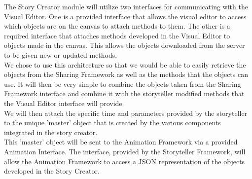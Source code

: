 \documentclass[12pt]{article}
\begin{document}
The Story Creator module will utilize two interfaces for communicating with the Visual Editor. One is a provided interface that allows the visual editor to access which objects are on the canvas to attach methods to them. The other is a required interface that attaches methods developed in the Visual Editor to objects made in the canvas. This allows the objects downloaded from the server to be given new or updated methods. \\

We chose to use this architecture so that we would be able to easily retrieve the objects from the Sharing Framework as well as the methods that the objects can use.  It will then be very simple to combine the objects taken from the Sharing Framework interface and combine it with the storyteller modified methods that the Visual Editor interface will provide.  \\

We will then attach the specific time and parameters provided by the storyteller to the unique 'master' object that is created by the various components integrated in the story creator. \\ 

This 'master' object will be sent to the Animation Framework via a provided Animation Interface. The interface, provided by the Storyteller Framework, will allow the Animation Framework to access a JSON representation of the objects developed in the Story Creator. \\


\end{document}

